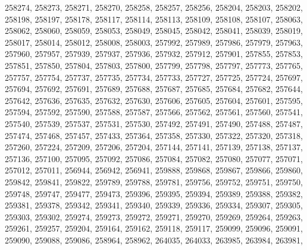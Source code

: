 \begin{appendix}
\begin{itemize}
     258274, 258273, 258271, 258270, 258258, 258257, 258256, 258204, 258203, 258202,\\
     258198, 258197, 258178, 258117, 258114, 258113, 258109, 258108, 258107, 258063,\\
     258062, 258060, 258059, 258053, 258049, 258045, 258042, 258041, 258039, 258019,\\
     258017, 258014, 258012, 258008, 258003, 257992, 257989, 257986, 257979, 257963,\\
     257960, 257957, 257939, 257937, 257936, 257932, 257912, 257901, 257855, 257853,\\
     257851, 257850, 257804, 257803, 257800, 257799, 257798, 257797, 257773, 257765,\\
     257757, 257754, 257737, 257735, 257734, 257733, 257727, 257725, 257724, 257697,\\
     257694, 257692, 257691, 257689, 257688, 257687, 257685, 257684, 257682, 257644,\\
     257642, 257636, 257635, 257632, 257630, 257606, 257605, 257604, 257601, 257595,\\
     257594, 257592, 257590, 257588, 257587, 257566, 257562, 257561, 257560, 257541,\\
     257540, 257539, 257537, 257531, 257530, 257492, 257491, 257490, 257488, 257487,\\
     257474, 257468, 257457, 257433, 257364, 257358, 257330, 257322, 257320, 257318,\\
     257260, 257224, 257209, 257206, 257204, 257144, 257141, 257139, 257138, 257137,\\
     257136, 257100, 257095, 257092, 257086, 257084, 257082, 257080, 257077, 257071,\\
     257012, 257011, 256944, 256942, 256941, 259888, 259868, 259867, 259866, 259860,\\
     259842, 259841, 259822, 259789, 259788, 259781, 259756, 259752, 259751, 259750,\\
     259748, 259747, 259477, 259473, 259396, 259395, 259394, 259389, 259388, 259382,\\
     259381, 259378, 259342, 259341, 259340, 259339, 259336, 259334, 259307, 259305,\\
     259303, 259302, 259274, 259273, 259272, 259271, 259270, 259269, 259264, 259263,\\
     259261, 259257, 259204, 259164, 259162, 259118, 259117, 259099, 259096, 259091,\\
     259090, 259088, 259086, 258964, 258962, 264035, 264033, 263985, 263984, 263981,\\

\end{itemize}
\end{appendix}
